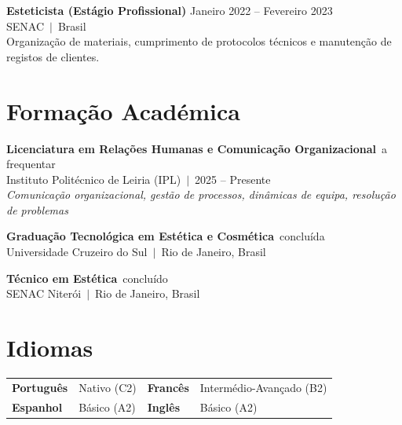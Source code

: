 \documentclass[10pt,a4paper]{article}
\begin{document}
\vspace{4pt}
{\small\bfseries Esteticista (Estágio Profissional)}\hfill{\small\color{subtle} Janeiro 2022 -- Fevereiro 2023}\\
{\small\color{accent} SENAC~$|$~Brasil}\\
{\small Organização de materiais, cumprimento de protocolos técnicos e manutenção de registos de clientes.}

\section{Formação Académica}

{\small\bfseries Licenciatura em Relações Humanas e Comunicação Organizacional}~\hfill{\small\color{subtle}a frequentar}\\
{\small Instituto Politécnico de Leiria (IPL)~$|$~2025 -- Presente}\\
{\small\color{subtle}\textit{Comunicação organizacional, gestão de processos, dinâmicas de equipa, resolução de problemas}}

\vspace{3pt}
{\small\bfseries Graduação Tecnológica em Estética e Cosmética}~\hfill{\small\color{subtle}concluída}\\
{\small Universidade Cruzeiro do Sul~$|$~Rio de Janeiro, Brasil}

\vspace{3pt}
{\small\bfseries Técnico em Estética}~\hfill{\small\color{subtle}concluído}\\
{\small SENAC Niterói~$|$~Rio de Janeiro, Brasil}

\section{Idiomas}

\begin{tabularx}{\textwidth}{llll}
  \small\textbf{Português} & \small Nativo (C2) &
  \small\textbf{Francês} & \small Intermédio-Avançado (B2) \\[2pt]
  \small\textbf{Espanhol} & \small Básico (A2) &
  \small\textbf{Inglês} & \small Básico (A2) \\
\end{tabularx}
\end{document}
